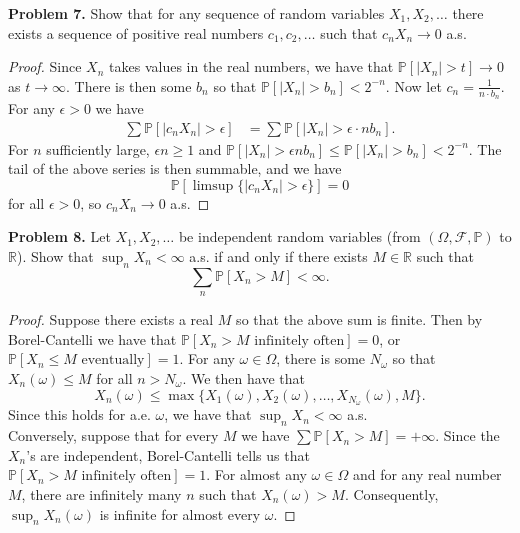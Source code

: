 \documentclass[11pt,letterpaper]{report}
\newcommand{\reals}{\mathbb{R}}
\newcommand{\mcal}[1]{\mathcal{#1}}
\newcommand{\Prob}{\mathbb{P}}
\begin{document}
\noindent\textbf{Problem 7. }
Show that for any sequence of random variables $X_1, X_2, \ldots$ there exists a sequence of positive real numbers $c_1, c_2, \ldots$ such that $c_nX_n\to 0$ a.s.
\begin{proof}
	Since $X_n$ takes values in the real numbers, we have that $\Prob[|X_n|>t] \to 0$ as $t\to \infty$. There is then some $b_n$ so that $\Prob[|X_n|>b_n]<2^{-n}$. Now let $c_n = \frac{1}{n\cdot b_n}$. For any $\epsilon>0$ we have
	\begin{align*}
		\sum \Prob[|c_nX_n|>\epsilon] & = \sum \Prob[|X_n| > \epsilon \cdot nb_n].
	\end{align*}
	For $n$ sufficiently large, $\epsilon n \geq 1$ and $\Prob[|X_n| >\epsilon n b_n] \leq \Prob[|X_n| > b_n] < 2^{-n}$. The tail of the above series is then summable, and we have
	\[
	\Prob[\limsup \{|c_n X_n| > \epsilon\}] = 0
	\]
	for all $\epsilon>0$, so $c_nX_n\to 0$ a.s.
\end{proof}

\noindent\textbf{Problem 8. }
Let $X_1, X_2, \ldots$ be independent random variables (from $(\Omega, \mcal{F}, \Prob)$ to $\reals$). Show that $\sup_n X_n<\infty$ a.s. if and only if there exists $M\in \reals$ such that
\[
\sum_n \Prob[X_n>M]<\infty.
\]
\begin{proof}
	Suppose there exists a real $M$ so that the above sum is finite. Then by Borel-Cantelli we have that $\Prob[X_n >M \text{ infinitely often}] = 0$, or $\Prob[X_n \leq M \text{ eventually}] = 1$. For any $\omega\in \Omega$, there is some $N_\omega$ so that $X_n(\omega)\leq M$ for all $n > N_\omega$. We then have that
	\[
	X_n(\omega) \leq \max\{X_1(\omega), X_2(\omega), \ldots, X_{N_\omega}(\omega), M \}.
	\]
	Since this holds for a.e. $\omega$, we have that $\sup_n X_n<\infty$ a.s.\\

	\noindent Conversely, suppose that for every $M$ we have $\sum \Prob[X_n>M] = +\infty$. Since the $X_n$'s are independent, Borel-Cantelli tells us that $\Prob[X_n >M\text{ infinitely often}] = 1$. For almost any $\omega\in \Omega$ and for any real number $M$, there are infinitely many $n$ such that $X_n(\omega)>M$. Consequently, $\sup_n X_n(\omega)$ is infinite for almost every $\omega$.
\end{proof}
\end{document}
